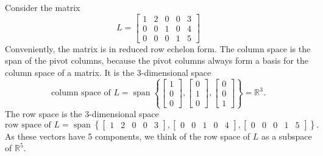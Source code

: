 \documentclass{ximera}
\begin{document}
\begin{example}
    Consider the matrix 
    \begin{equation*}
        L =
        \begin{bmatrix}
            {1} & 2 & 0 & 0 & 3 \\
            0 & 0 & {1} & 0 & 4 \\
            0 & 0 & 0 & {1} & 5
        \end{bmatrix} 
    \end{equation*}
    Conveniently, the matrix is in reduced row echelon form. The column space is the span of the pivot columns, because the pivot columns always form a basis for the column space of a matrix. It is the 3-dimensional space
    \begin{equation*}
        \text{column space of $L$} =
        \operatorname{span} 
        \left\{
            \begin{bmatrix}
                1 \\
                0 \\
                0
            \end{bmatrix} 
            ,
            \begin{bmatrix}
                0 \\
                1 \\
                0
            \end{bmatrix} 
            ,
            \begin{bmatrix}
                0 \\
                0 \\
                1
            \end{bmatrix} 
        \right\}
        = {\mathbb{R}}^3 .
    \end{equation*}
    The row space is the 3-dimensional space
    \begin{equation*}
        \text{row space of $L$} =
        \operatorname{span} 
        \left\{
            \begin{bmatrix}
                1 & 2 & 0 & 0 & 3
            \end{bmatrix} 
            ,
            \begin{bmatrix}
                0 & 0 & 1 & 0 & 4
            \end{bmatrix} 
            ,
            \begin{bmatrix}
                0 & 0 & 0 & 1 & 5
            \end{bmatrix} 
        \right\} .
    \end{equation*}
    As these vectors have 5 components, we think of the row space of $L$ as a subspace of ${\mathbb{R}}^5$.
\end{example}
\end{document}

